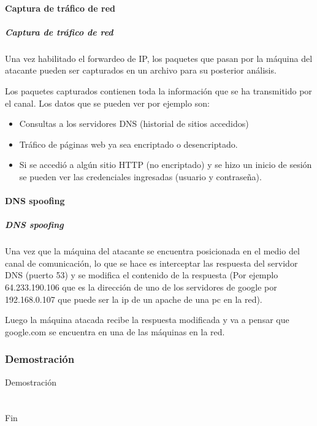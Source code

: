 \documentclass{beamer}
\begin{document}

\subsection{Captura de tráfico de red}
\begin{frame}[allowframebreaks]
	\frametitle{Captura de tráfico de red}
	\par Una vez habilitado el forwardeo de IP, los paquetes que pasan por la máquina del atacante pueden ser capturados en un archivo para su posterior análisis.
	\par Los paquetes capturados contienen toda la información que se ha transmitido por el canal. Los datos que se pueden ver por ejemplo son:
	\begin{itemize}
		\item Consultas a los servidores DNS (historial de sitios accedidos)
		\item Tráfico de páginas web ya sea encriptado o desencriptado.
		\item Si se accedió a algún sitio HTTP (no encriptado) y se hizo un inicio de sesión se pueden ver las credenciales ingresadas (usuario y contraseña).
	\end{itemize}
\end{frame}


\subsection{DNS spoofing}
\begin{frame}[allowframebreaks]
	\frametitle{DNS spoofing}
	\par Una vez que la máquina del atacante se encuentra posicionada en el medio del canal de comunicación, lo que se hace es interceptar las respuesta del servidor DNS (puerto 53) y se modifica el contenido de la respuesta (Por ejemplo 64.233.190.106 que es la dirección de uno de los servidores de google por 192.168.0.107 que puede ser la ip de un apache de una pc en la red).
	\par Luego la máquina atacada recibe la respuesta modificada y va a pensar que google.com se encuentra en una de las máquinas en la red.
\end{frame}


\section{Demostración}
\begin{frame}
\Huge{\centerline{Demostración}}
\end{frame}

\part{}
\begin{frame}
\Huge{\centerline{Fin}}
\end{frame}

\end{document}

